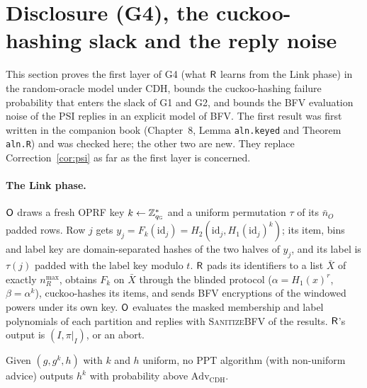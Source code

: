 \section{Disclosure (G4), the cuckoo-hashing slack and the reply noise}
\label{sec:G4}

This section proves the first layer of G4 (what $\mathsf{R}$ learns from the Link phase) in the random-oracle model under CDH, bounds the cuckoo-hashing failure probability that enters the slack of G1 and G2, and bounds the BFV evaluation noise of the PSI replies in an explicit model of BFV. The first result was first written in the companion book (Chapter~8, Lemma \texttt{aln.keyed} and Theorem \texttt{aln.R}) and was checked here; the other two are new. They replace Correction~\ref{cor:psi} as far as the first layer is concerned.

\paragraph{The Link phase.} $\mathsf{O}$ draws a fresh OPRF key $k\gets\mathbb{Z}_{q_{\mathbb G}}^\ast$ and a uniform permutation $\tau$ of its $\bar n_O$ padded rows. Row $j$ gets $y_j=F_k(\mathrm{id}_j)=H_2(\mathrm{id}_j,H_1(\mathrm{id}_j)^k)$; its item, bins and label key are domain-separated hashes of the two halves of $y_j$, and its label is $\tau(j)$ padded with the label key modulo $t$. $\mathsf{R}$ pads its identifiers to a list $\bar X$ of exactly $n_R^{\max}$, obtains $F_k$ on $\bar X$ through the blinded protocol ($\alpha=H_1(x)^r$, $\beta=\alpha^k$), cuckoo-hashes its items, and sends BFV encryptions of the windowed powers under its own key. $\mathsf{O}$ evaluates the masked membership and label polynomials of each partition and replies with \textsc{SanitizeBFV} of the results. $\mathsf{R}$'s output is $(I,\pi|_I)$, or an abort.

\begin{assumption}\label{as:cdh}
Given $(g,g^k,h)$ with $k$ and $h$ uniform, no PPT algorithm (with non-uniform advice) outputs $h^k$ with probability above $\mathrm{Adv}_{\mathrm{CDH}}$.
\end{assumption}

